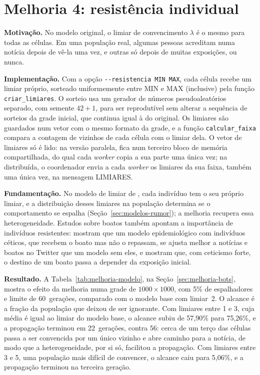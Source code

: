 \section{Melhoria 4: resistência individual}\label{sec:melhoria-resistencia}

\textbf{Motivação.} No modelo original, o limiar de convencimento $\lambda$ é o mesmo para todas as células. Em uma população real, algumas pessoas acreditam numa notícia depois de vê-la uma vez, e outras só depois de muitas exposições, ou nunca.

\textbf{Implementação.} Com a opção \texttt{-{}-resistencia MIN MAX}, cada célula recebe um limiar próprio, sorteado uniformemente entre MIN e MAX (inclusive) pela função \texttt{criar\_limiares}. O sorteio usa um gerador de números pseudoaleatórios separado, com semente $42 + 1$, para ser reprodutível sem alterar a sequência de sorteios da grade inicial, que continua igual à do original. Os limiares são guardados num vetor com o mesmo formato da grade, e a função \texttt{calcular\_faixa} compara a contagem de vizinhos de cada célula com o limiar dela. O vetor de limiares só é lido: na versão paralela, fica num terceiro bloco de memória compartilhada, do qual cada \textit{worker} copia a sua parte uma única vez; na distribuída, o coordenador envia a cada \textit{worker} os limiares da sua faixa, também uma única vez, na mensagem LIMIARES.

\textbf{Fundamentação.} No modelo de limiar de , cada indivíduo tem o seu próprio limiar, e a distribuição desses limiares na população determina se o comportamento se espalha (Seção~\ref{sec:modelos-rumor}); a melhoria recupera essa heterogeneidade. Estudos sobre boatos também apontam a importância de indivíduos resistentes:  mostram que um modelo epidemiológico com indivíduos céticos, que recebem o boato mas não o repassam, se ajusta melhor a notícias e boatos no Twitter que um modelo sem eles, e  mostram que, com ceticismo forte, o destino de um boato passa a depender da exposição inicial.

\textbf{Resultado.} A Tabela~\ref{tab:melhoria-modelo}, na Seção~\ref{sec:melhoria-bots}, mostra o efeito da melhoria numa grade de $1000 \times 1000$, com 5\% de espalhadores e limite de 60~gerações, comparado com o modelo base com limiar~2. O alcance é a fração da população que deixou de ser ignorante. Com limiares entre 1 e 3, cuja média é igual ao limiar do modelo base, o alcance subiu de 57,90\% para 75,26\%, e a propagação terminou em 22~gerações, contra 56: cerca de um terço das células passa a ser convencida por um único vizinho e abre caminho para a notícia, de modo que a heterogeneidade, por si só, facilitou a propagação. Com limiares entre 3 e 5, uma população mais difícil de convencer, o alcance caiu para 5,06\%, e a propagação terminou na terceira geração.

